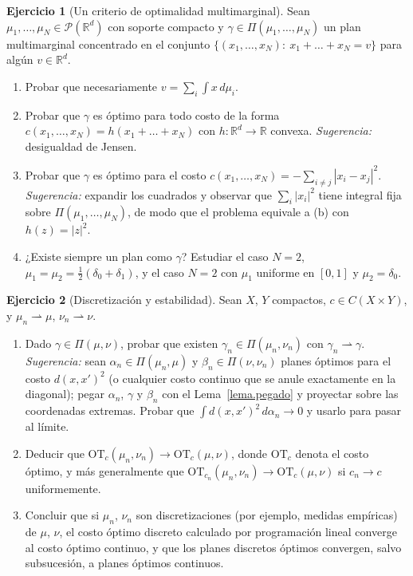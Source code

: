 \documentclass[12pt, a4paper]{amsbook}
\newcommand{\R}{{\mathbb R}}
\theoremstyle{remark}
\theoremstyle{definition}
\newtheorem{ejercicio}{Ejercicio}[chapter]
\numberwithin{section}{chapter}
\numberwithin{subsection}{section}
\numberwithin{equation}{section}
\numberwithin{figure}{chapter}
\begin{document}
\begin{ejercicio}[Un criterio de optimalidad multimarginal]\label{ejer.multimarginal.criterio}
Sean $\mu_1,\dots,\mu_N\in\mathcal P(\R^d)$ con soporte compacto y
$\gamma\in\Pi(\mu_1,\dots,\mu_N)$ un plan multimarginal concentrado en el
conjunto $\{(x_1,\dots,x_N):\ x_1+\dots+x_N=v\}$ para algún $v\in\R^d$.
\begin{enumerate}[label=(\alph*)]
\item Probar que necesariamente $v=\sum_i\int x\,d\mu_i$.
\item Probar que $\gamma$ es óptimo para todo costo de la forma
$c(x_1,\dots,x_N)=h(x_1+\dots+x_N)$ con $h\colon\R^d\to\R$ convexa.
\emph{Sugerencia:} desigualdad de Jensen.
\item Probar que $\gamma$ es óptimo para el costo
$c(x_1,\dots,x_N)=-\sum_{i\ne j}|x_i-x_j|^2$. \emph{Sugerencia:} expandir
los cuadrados y observar que $\sum_i|x_i|^2$ tiene integral fija sobre
$\Pi(\mu_1,\dots,\mu_N)$, de modo que el problema equivale a (b) con
$h(z)=|z|^2$.
\item ¿Existe siempre un plan como $\gamma$? Estudiar el caso $N=2$,
$\mu_1=\mu_2=\frac12(\delta_0+\delta_1)$, y el caso $N=2$ con $\mu_1$
uniforme en $[0,1]$ y $\mu_2=\delta_0$.
\end{enumerate}
\end{ejercicio}

\begin{ejercicio}[Discretización y estabilidad]\label{ejer.discretizacion.estabilidad}
Sean $X$, $Y$ compactos, $c\in C(X\times Y)$, y $\mu_n\rightharpoonup\mu$,
$\nu_n\rightharpoonup\nu$.
\begin{enumerate}[label=(\alph*)]
\item Dado $\gamma\in\Pi(\mu,\nu)$, probar que existen
$\gamma_n\in\Pi(\mu_n,\nu_n)$ con $\gamma_n\rightharpoonup\gamma$.
\emph{Sugerencia:} sean $\alpha_n\in\Pi(\mu_n,\mu)$ y $\beta_n\in\Pi(\nu,\nu_n)$
planes óptimos para el costo $d(x,x')^2$ (o cualquier costo continuo que
se anule exactamente en la diagonal); pegar $\alpha_n$, $\gamma$ y $\beta_n$
con el Lema~\ref{lema.pegado} y proyectar sobre las coordenadas
extremas. Probar que $\int d(x,x')^2\,d\alpha_n\to0$ y usarlo para pasar al límite.
\item Deducir que $\mathrm{OT}_c(\mu_n,\nu_n)\to\mathrm{OT}_c(\mu,\nu)$, donde
$\mathrm{OT}_c$ denota el costo óptimo, y más generalmente que
$\mathrm{OT}_{c_n}(\mu_n,\nu_n)\to\mathrm{OT}_c(\mu,\nu)$ si $c_n\to c$
uniformemente.
\item Concluir que si $\mu_n$, $\nu_n$ son discretizaciones (por ejemplo,
medidas empíricas) de $\mu$, $\nu$, el costo óptimo discreto calculado por
programación lineal converge al costo óptimo continuo, y que los planes
discretos óptimos convergen, salvo subsucesión, a planes óptimos continuos.
\end{enumerate}
\end{ejercicio}
\end{document}
